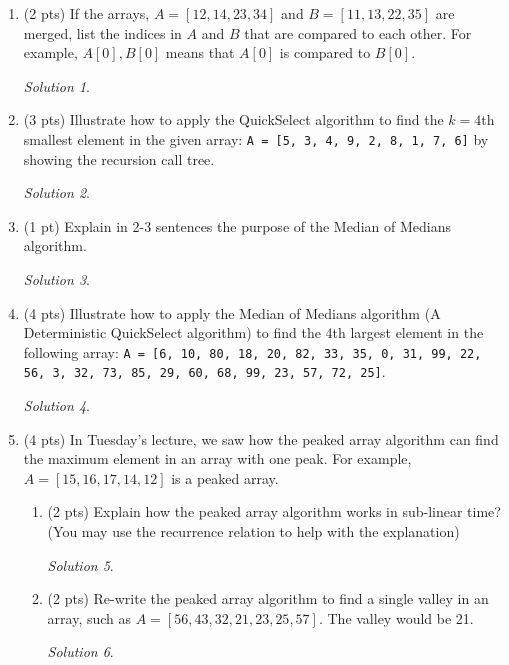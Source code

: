 \documentclass[12pt]{article}
\theoremstyle{remark}
\newtheorem*{solution}{Solution}
\begin{document}
\hrulefill
\pagebreak


\begin{enumerate}
\item (2 pts) If the arrays, $A=[12, 14, 23, 34]$ and $B=[11, 13, 22, 35]$ are merged, list the indices in $A$ and $B$ that are compared to each other. For example, $A[0], B[0]$ means that $A[0]$ is compared to $B[0]$.
\begin{solution}

\end{solution}

\item (3 pts) Illustrate how to apply the QuickSelect algorithm to find the $k = 4$th smallest element in the given array: \texttt{A = [5, 3, 4, 9, 2, 8, 1, 7, 6]} by showing the recursion call tree.
\begin{solution}

\end{solution}
\pagebreak
\item (1 pt) Explain in 2-3 sentences the purpose of the Median of Medians algorithm.
\begin{solution}

\end{solution}

\item (4 pts) Illustrate how to apply the Median of Medians algorithm (A Deterministic QuickSelect algorithm) to find the $4$th largest element in the following array: \texttt{A = [6, 10, 80, 18, 20, 82, 33, 35, 0, 31, 99, 22, 56, 3, 32, 73, 85, 29, 60, 68, 99, 23, 57, 72, 25]}.
\begin{solution}

\end{solution}
\pagebreak
\item (4 pts) In Tuesday's lecture, we saw how the peaked array algorithm can find the maximum element in an array with one peak. For example, $A=[15, 16, 17, 14, 12]$ is a peaked array.
\begin{enumerate}[label=(\alph*)]
\item (2 pts) Explain how the peaked array algorithm works in sub-linear time? 
(You may use the recurrence relation to help with the explanation)
\begin{solution}

\end{solution}

\item (2 pts) Re-write the peaked array algorithm to find a single valley in an array, such as $A=[56, 43, 32, 21, 23, 25, 57]$. The valley would be 21.
\begin{solution}

\end{solution}

\end{enumerate}

\end{enumerate}
\end{document}
